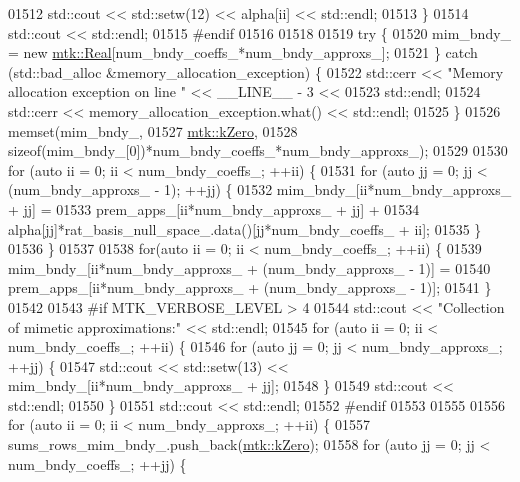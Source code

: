 \begin{DoxyCode}
{{01512     std::cout << std::setw(12) << alpha[ii] << std::endl;
01513   \}
01514   std::cout << std::endl;
01515 \textcolor{preprocessor}{  #endif}
01516 
01518 
01519   \textcolor{keywordflow}{try} \{
01520     mim\_bndy\_ = \textcolor{keyword}{new} \hyperlink{group__c01-roots_gac080bbbf5cbb5502c9f00405f894857d}{mtk::Real}[num\_bndy\_coeffs\_*num\_bndy\_approxs\_];
01521   \} \textcolor{keywordflow}{catch} (std::bad\_alloc &memory\_allocation\_exception) \{
01522     std::cerr << \textcolor{stringliteral}{"Memory allocation exception on line "} << \_\_LINE\_\_ - 3 <<
01523       std::endl;
01524     std::cerr << memory\_allocation\_exception.what() << std::endl;
01525   \}
01526   memset(mim\_bndy\_,
01527          \hyperlink{group__c01-roots_ga59a451a5fae30d59649bcda274fea271}{mtk::kZero},
01528          \textcolor{keyword}{sizeof}(mim\_bndy\_[0])*num\_bndy\_coeffs\_*num\_bndy\_approxs\_);
01529 
01530   \textcolor{keywordflow}{for} (\textcolor{keyword}{auto} ii = 0; ii < num\_bndy\_coeffs\_; ++ii) \{
01531     \textcolor{keywordflow}{for} (\textcolor{keyword}{auto} jj = 0; jj < (num\_bndy\_approxs\_ - 1); ++jj) \{
01532       mim\_bndy\_[ii*num\_bndy\_approxs\_ + jj] =
01533         prem\_apps\_[ii*num\_bndy\_approxs\_ + jj] +
01534         alpha[jj]*rat\_basis\_null\_space\_.data()[jj*num\_bndy\_coeffs\_ + ii];
01535     \}
01536   \}
01537 
01538   \textcolor{keywordflow}{for}(\textcolor{keyword}{auto} ii = 0; ii < num\_bndy\_coeffs\_; ++ii) \{
01539     mim\_bndy\_[ii*num\_bndy\_approxs\_ + (num\_bndy\_approxs\_ - 1)] =
01540       prem\_apps\_[ii*num\_bndy\_approxs\_ + (num\_bndy\_approxs\_ - 1)];
01541   \}
01542 
01543 \textcolor{preprocessor}{  #if MTK\_VERBOSE\_LEVEL > 4}
01544   std::cout << \textcolor{stringliteral}{"Collection of mimetic approximations:"} << std::endl;
01545   \textcolor{keywordflow}{for} (\textcolor{keyword}{auto} ii = 0; ii < num\_bndy\_coeffs\_; ++ii) \{
01546     \textcolor{keywordflow}{for} (\textcolor{keyword}{auto} jj = 0; jj < num\_bndy\_approxs\_; ++jj) \{
01547       std::cout << std::setw(13) << mim\_bndy\_[ii*num\_bndy\_approxs\_ + jj];
01548     \}
01549     std::cout << std::endl;
01550   \}
01551   std::cout << std::endl;
01552 \textcolor{preprocessor}{  #endif}
01553 
01555 
01556   \textcolor{keywordflow}{for} (\textcolor{keyword}{auto} ii = 0; ii < num\_bndy\_approxs\_; ++ii) \{
01557     sums\_rows\_mim\_bndy\_.push\_back(\hyperlink{group__c01-roots_ga59a451a5fae30d59649bcda274fea271}{mtk::kZero});
01558     \textcolor{keywordflow}{for} (\textcolor{keyword}{auto} jj = 0; jj < num\_bndy\_coeffs\_; ++jj) \{
}}
\end{DoxyCode}
